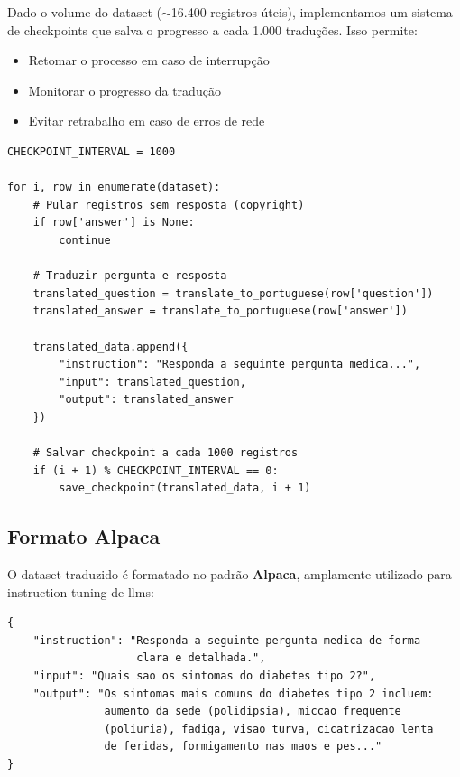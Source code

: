 Dado o volume do dataset ($\sim$16.400 registros úteis), implementamos um sistema de checkpoints que salva o progresso a cada 1.000 traduções. Isso permite:

\begin{itemize}
    \item Retomar o processo em caso de interrupção
    \item Monitorar o progresso da tradução
    \item Evitar retrabalho em caso de erros de rede
\end{itemize}

\begin{lstlisting}[caption={Sistema de checkpoint para tradução}, label={lst:checkpoint}]
CHECKPOINT_INTERVAL = 1000

for i, row in enumerate(dataset):
    # Pular registros sem resposta (copyright)
    if row['answer'] is None:
        continue

    # Traduzir pergunta e resposta
    translated_question = translate_to_portuguese(row['question'])
    translated_answer = translate_to_portuguese(row['answer'])

    translated_data.append({
        "instruction": "Responda a seguinte pergunta medica...",
        "input": translated_question,
        "output": translated_answer
    })

    # Salvar checkpoint a cada 1000 registros
    if (i + 1) % CHECKPOINT_INTERVAL == 0:
        save_checkpoint(translated_data, i + 1)
\end{lstlisting}

\subsection{Formato Alpaca}
\label{subsec:formato-alpaca}

O dataset traduzido é formatado no padrão \textbf{Alpaca}, amplamente utilizado para instruction tuning de \acrshort{llm}s:

\begin{lstlisting}[caption={Estrutura do formato Alpaca}, label={lst:alpaca-format}]
{
    "instruction": "Responda a seguinte pergunta medica de forma
                    clara e detalhada.",
    "input": "Quais sao os sintomas do diabetes tipo 2?",
    "output": "Os sintomas mais comuns do diabetes tipo 2 incluem:
               aumento da sede (polidipsia), miccao frequente
               (poliuria), fadiga, visao turva, cicatrizacao lenta
               de feridas, formigamento nas maos e pes..."
}
\end{lstlisting}

